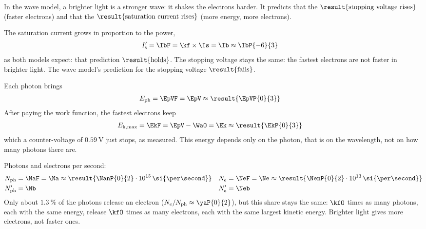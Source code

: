 \begin{abcliste}
\abc In the wave model, a brighter light is a stronger wave: it shakes the electrons harder. It predicts that the $\result{\text{stopping voltage rises}}$ (faster electrons) and that the $\result{\text{saturation current rises}}$ (more energy, more electrons).

\abc The saturation current grows in proportion to the power,
\begin{align}
 I_\mathrm{s}' &= \IbF = \kf\times\Is = \Ib \approx \IbP{-6}{3}
\end{align}
as both models expect: that prediction $\result{\text{holds}}$. The stopping voltage stays the same: the fastest electrons are not faster in brighter light. The wave model's prediction for the stopping voltage $\result{\text{fails}}$.

\abc Each photon brings
\begin{align}
 E_\mathrm{ph} &= \EpVF = \EpV \approx \result{\EpVP{0}{3}}
\end{align}
After paying the work function, the fastest electrons keep
\begin{align}
 E_\mathrm{k,max} &= \EkF = \EpV - \WaO = \Ek \approx \result{\EkP{0}{3}}
\end{align}
which a counter-voltage of $\SI{0.59}{\V}$ just stops, as measured. This energy depends only on the photon, that is on the wavelength, not on how many photons there are.

Photons and electrons per second:
\begin{align}
 N_\mathrm{ph} &= \NaF = \Na \approx \result{\NanP{0}{2}\cdot 10^{15}\,\si{\per\second}} & N_e &= \NeF = \Ne \approx \result{\NenP{0}{2}\cdot 10^{13}\,\si{\per\second}} \\
 N_\mathrm{ph}' &= \Nb & N_e' &= \Neb
\end{align}
Only about $\SI{1.3}{\percent}$ of the photons release an electron ($N_e/N_\mathrm{ph} \approx \yaP{0}{2}$), but this share stays the same: $\kfO$ times as many photons, each with the same energy, release $\kfO$ times as many electrons, each with the same largest kinetic energy. Brighter light gives more electrons, not faster ones.
\end{abcliste}
